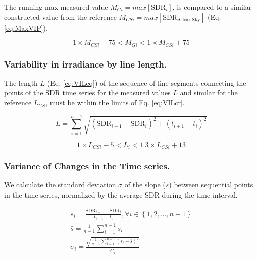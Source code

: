\documentclass[preprint, 3p,
authoryear]{elsarticle} %
\begin{document}
The running max measured value \(M_{Gi} = max[\text{SDR}_{i}]\), is
compared to a similar constructed value from the reference
\(M_{CSi} = max[\text{SDR}_{i\text{Clear Sky}}]\) (Eq. \ref{eq:MaxVIP}).

\begin{equation}
1 \times M_{CSi} - 75
< M_{Gi} <
1 \times M_{CSi} + 75
\label{eq:MaxVIP}
\end{equation}

\hypertarget{variability-in-irradiance-by-line-length.}{%
\subsubsection{Variability in irradiance by line
length.}\label{variability-in-irradiance-by-line-length.}}

The length \(L\) (Eq. \ref{eq:VILeq}) of the sequence of line segments
connecting the points of the SDR time series for the measured values
\(L\) and similar for the reference \(L_{CS}\), must be within the
limits of Eq. \ref{eq:VILcr}.

\begin{equation}
L = \sum_{i=1}^{n-1}\sqrt{\left ( \text{SDR}_{i+1} - \text{SDR}_{i}\right )^2 + \left ( t_{i+1} - t_i \right )^2}
\label{eq:VILeq}
\end{equation}

\begin{equation}
1 \times L_{CSi} - 5 < L_i < 1.3 \times L_{CSi} + 13
\label{eq:VILcr}
\end{equation}

\hypertarget{variance-of-changes-in-the-time-series.}{%
\subsubsection{Variance of Changes in the Time
series.}\label{variance-of-changes-in-the-time-series.}}

We calculate the standard deviation \(\sigma\) of the slope (\(s\))
between sequential points in the time series, normalized by the average
SDR during the time interval.

\begin{gather}
s_i = \frac{\text{SDR}_{i+1} - \text{SDR}_{i}}{t_{i+1} - t_i}, \forall i \in \left \{ 1, 2, \ldots, n-1 \right \} \label{eq:VCT1} \\
\bar{s} = \frac{1}{n-1} \sum_{i=1}^{n-1} s_i \label{eq:VCT2} \\
\sigma_i = \frac {\sqrt{\frac{1}{n-1} \sum_{i=1}^{n-1} \left( s_i - \bar{s} \right)^2} } {\bar{G_i}} \label{eq:VCT3}
\end{gather}
\end{document}
